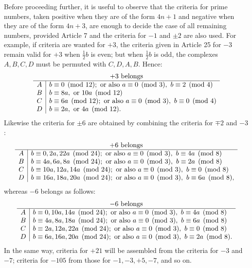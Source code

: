 \documentclass[12pt]{article}
\begin{document}
Before proceeding further, it is useful to observe that the criteria for prime numbers, taken positive when they are of the form $4n+1$ and negative when they are of the form $4n+3$, are enough to decide the case of all remaining numbers, provided Article 7 and the criteria for $-1$ and $\pm2$ are also used. For example, if criteria are wanted for $+3$, the criteria given in Article 25 for $-3$ remain valid for $+3$ when $\frac12b$ is even; but when $\frac12b$ is odd, the complexes $A,B,C,D$ must be permuted with $C,D,A,B$. Hence:
\[
\begin{array}{c|l}
\multicolumn{2}{c}{+3\ \text{belongs}}\\\hline
A& b\equiv0\pmod{12};\ \text{or also }a\equiv0\pmod3,\ b\equiv2\pmod4\\
B& b\equiv8a,\ \text{or }10a\pmod{12}\\
C& b\equiv6a\pmod{12};\ \text{or also }a\equiv0\pmod3,\ b\equiv0\pmod4\\
D& b\equiv2a,\ \text{or }4a\pmod{12}.
\end{array}
\]
Likewise the criteria for $\pm6$ are obtained by combining the criteria for $\mp2$ and $-3$:
\[
\begin{array}{c|l}
\multicolumn{2}{c}{+6\ \text{belongs}}\\\hline
A& b\equiv0,2a,22a\pmod{24};\ \text{or also }a\equiv0\pmod3,\ b\equiv4a\pmod8\\
B& b\equiv4a,6a,8a\pmod{24};\ \text{or also }a\equiv0\pmod3,\ b\equiv2a\pmod8\\
C& b\equiv10a,12a,14a\pmod{24};\ \text{or also }a\equiv0\pmod3,\ b\equiv0\pmod8\\
D& b\equiv16a,18a,20a\pmod{24};\ \text{or also }a\equiv0\pmod3,\ b\equiv6a\pmod8,
\end{array}
\]
whereas $-6$ belongs as follows:
\[
\begin{array}{c|l}
\multicolumn{2}{c}{-6\ \text{belongs}}\\\hline
A& b\equiv0,10a,14a\pmod{24};\ \text{or also }a\equiv0\pmod3,\ b\equiv4a\pmod8\\
B& b\equiv4a,8a,18a\pmod{24};\ \text{or also }a\equiv0\pmod3,\ b\equiv6a\pmod8\\
C& b\equiv2a,12a,22a\pmod{24};\ \text{or also }a\equiv0\pmod3,\ b\equiv0\pmod8\\
D& b\equiv6a,16a,20a\pmod{24};\ \text{or also }a\equiv0\pmod3,\ b\equiv2a\pmod8.
\end{array}
\]
In the same way, criteria for $+21$ will be assembled from the criteria for $-3$ and $-7$; criteria for $-105$ from those for $-1,-3,+5,-7$, and so on.
\end{document}
